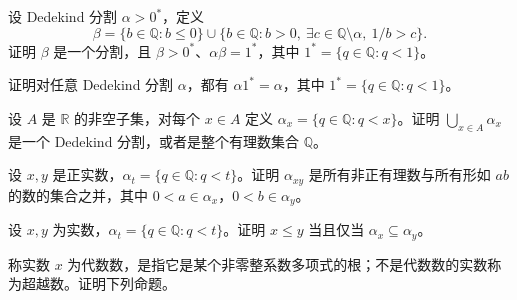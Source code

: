 \noindent\begin{minipage}{\textwidth}
设 Dedekind 分割 $\alpha>0^*$，定义\[\beta=\{b\in\mathbb Q:b\le0\}\cup\{b\in\mathbb Q:b>0,\ \exists c\in\mathbb Q\setminus\alpha,\ 1/b>c\}.\]证明 $\beta$ 是一个分割，且 $\beta>0^*$、$\alpha\beta=1^*$，其中 $1^*=\{q\in\mathbb Q:q<1\}$。
\end{minipage}\par\vfill
\noindent\begin{minipage}{\textwidth}
证明对任意 Dedekind 分割 $\alpha$，都有 $\alpha1^*=\alpha$，其中 $1^*=\{q\in\mathbb Q:q<1\}$。
\end{minipage}\par\vfill
\newpage
\noindent\begin{minipage}{\textwidth}
设 $A$ 是 $\mathbb R$ 的非空子集，对每个 $x\in A$ 定义 $\alpha_x=\{q\in\mathbb Q:q<x\}$。证明 $\bigcup_{x\in A}\alpha_x$ 是一个 Dedekind 分割，或者是整个有理数集合 $\mathbb Q$。
\end{minipage}\par\vfill
\noindent\begin{minipage}{\textwidth}
设 $x,y$ 是正实数，$\alpha_t=\{q\in\mathbb Q:q<t\}$。证明 $\alpha_{xy}$ 是所有非正有理数与所有形如 $ab$ 的数的集合之并，其中 $0<a\in\alpha_x$，$0<b\in\alpha_y$。
\end{minipage}\par\vfill
\noindent\begin{minipage}{\textwidth}
设 $x,y$ 为实数，$\alpha_t=\{q\in\mathbb Q:q<t\}$。证明 $x\le y$ 当且仅当 $\alpha_x\subseteq\alpha_y$。
\end{minipage}\par\vfill
\noindent\begin{minipage}{\textwidth}
称实数 $x$ 为代数数，是指它是某个非零整系数多项式的根；不是代数数的实数称为超越数。证明下列命题。
\end{minipage}\par\vfill

